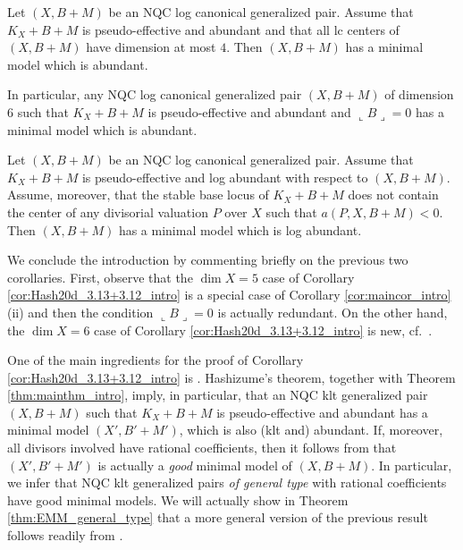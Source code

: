 	\begin{corA}[= Corollaries \ref{cor:Hash20d_3.13} and \ref{cor:Hash20d_3.12}]
		\label{cor:Hash20d_3.13+3.12_intro}
		Let $(X,B+M)$ be an NQC log canonical generalized pair. Assume that $K_X+B+M$ is pseudo-effective and abundant and that all lc centers of $(X,B+M)$ have dimension at most $ 4 $. Then $(X,B+M)$ has a minimal model which is abundant.
		
		In particular, any NQC log canonical generalized pair $(X,B+M)$ of dimension $6$ such that $K_X+B+M$ is pseudo-effective and abundant and $\llcorner B \lrcorner = 0$ has a minimal model which is abundant.
	\end{corA}
	
	\begin{corA}[= Corollary \ref{cor:Hash20d_3.10}]
		\label{cor:Hash20d_3.10_intro}
		Let $(X,B+M)$ be an NQC log canonical generalized pair. Assume that $K_X+B+M$ is pseudo-effective and log abundant with respect to $(X,B+M)$. Assume, moreover, that the stable base locus of $K_X+B+M$ does not contain the center of any divisorial valuation $ P $ over $X$ such that $ a(P,X,B+M) < 0 $. Then $(X,B+M)$ has a minimal model which is log abundant.
	\end{corA}
	
	We conclude the introduction by commenting briefly on the previous two corollaries. First, observe that the $\dim X = 5$ case of Corollary \ref{cor:Hash20d_3.13+3.12_intro} is a special case of Corollary \ref{cor:maincor_intro}(ii) and then the condition $\llcorner B \lrcorner =0$ is actually redundant. On the other hand, the $\dim X = 6$ case of Corollary \ref{cor:Hash20d_3.13+3.12_intro} is new, cf.\ \cite[Corollary 1.6]{Hash20d}. 
	
	One of the main ingredients for the proof of Corollary \ref{cor:Hash20d_3.13+3.12_intro} is \cite[Theorem 3.14]{Hash22a}. Hashizume's theorem, together with Theorem \ref{thm:mainthm_intro}, imply, in particular, that an NQC klt generalized pair $(X,B+M)$ such that $K_X+B+M$ is pseudo-effective and abundant has a minimal model $(X',B'+M')$, which is also (klt and) abundant. If, moreover, all divisors involved have rational coefficients, then it follows from \cite[Theorem 2]{Chaud22b} that $(X',B'+M')$ is actually a \emph{good} minimal model of $(X,B+M)$. In particular, we infer that NQC klt generalized pairs \emph{of general type} with rational coefficients have good minimal models. We will actually show in Theorem \ref{thm:EMM_general_type} that a more general version of the previous result follows readily from \cite{BCHM10}.
	
